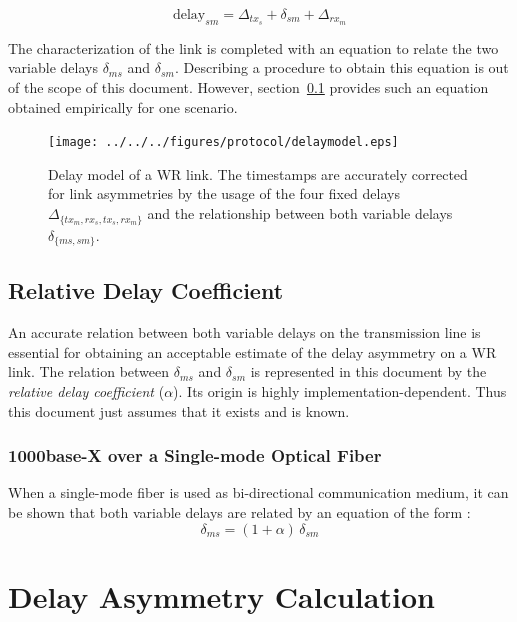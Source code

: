 \documentclass[a4paper, 12pt]{article}
\newcommand{\eqdelay}[1]{{\text{delay}}_{#1}}
\begin{document}
\begin{equation}
  \label{eq:delaysm}
  \eqdelay{sm} = \Delta_{tx_s} + \delta_{sm} + \Delta_{rx_m}
\end{equation}

The characterization of the link is completed with an equation to
relate the two variable delays $\delta_{ms}$ and $\delta_{sm}$.
Describing a procedure to obtain this equation is out of the scope of this document. However, 
section~\ref{sec:physcorr} provides such an equation obtained empirically for one scenario.

\begin{figure}[ht!]
  \centering
    \texttt{[image: ../../../figures/protocol/delaymodel.eps]}
  \caption{Delay model of a WR link. The timestamps are accurately corrected
    for link asymmetries by the usage of the four fixed delays
    $\Delta_{\{tx_m, rx_s, tx_s, rx_m\}}$ and the relationship
    between both variable delays $\delta_{\{ms, sm\}}$. }
  \label{fig:delaymodel}
\end{figure}

\subsection{Relative Delay Coefficient}
\label{sec:physcorr}

An accurate relation between both variable delays on the transmission line
is essential for obtaining an acceptable estimate of the delay asymmetry on a
WR link. The relation between $\delta_{ms}$ and $\delta_{sm}$ is represented in 
this document by the \textit{relative delay coefficient} ($\alpha$).
Its origin is highly implementation-dependent. Thus this document just assumes that it exists 
and is known. 

\subsubsection{1000base-X over a Single-mode Optical Fiber}
\label{sec:singlefiber}
When a single-mode fiber is used as bi-directional communication medium,
it can be shown that both variable delays are related by an equation of
the form \cite{Peek2010}:
\begin{equation}
\delta_{ms} = (1 + \alpha) \, \delta_{sm}
\label{eq:singlefiber}
\end{equation}

\section{Delay Asymmetry Calculation}
\label{sec:delayAsymCal}
\end{document}
